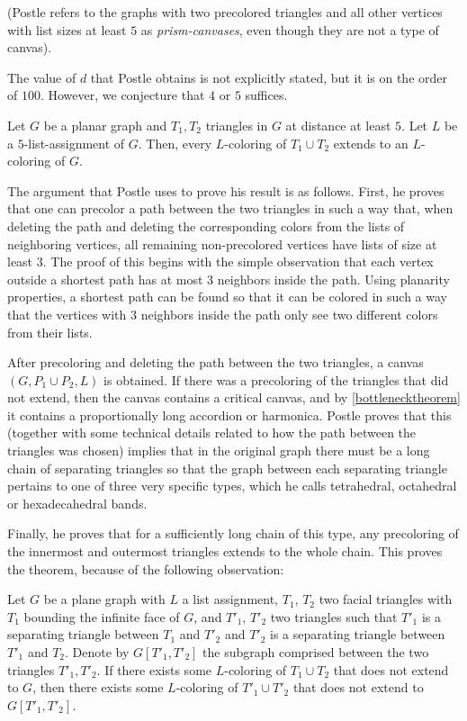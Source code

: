(Postle refers to the graphs with two precolored triangles and all other vertices with list sizes
at least $5$ as \emph{prism-canvases}, even though they are not a type of canvas).

The value of $d$ that Postle obtains is not explicitly stated, but it is on the order of $100$. However, we conjecture that $4$ or $5$ suffices.

\begin{conjecture}
\label{twotriangleconjecture}
Let $G$ be a planar graph and $T_1, T_2$ triangles in $G$ at distance at least $5$. Let $L$ be a $5$-list-assignment of $G$. Then, every $L$-coloring of $T_1 \cup T_2$ extends to an $L$-coloring of $G$.
\end{conjecture}

The argument that Postle uses to prove his result is as follows. First, he proves that one can precolor a path between the two triangles in such a way that, when deleting the path and deleting the corresponding colors from the lists of neighboring vertices, all remaining non-precolored vertices have lists of size at least $3$. The proof of this begins with the simple observation that each vertex outside a shortest path has at most $3$ neighbors inside the path. Using planarity properties, a shortest path can be found so that it can be colored in such a way that the vertices with $3$ neighbors inside the path only see two different colors from their lists.

After precoloring and deleting the path between the two triangles, a canvas $(G, P_1 \cup P_2, L)$ is obtained. If there was a precoloring of the triangles that did not extend, then the canvas contains a critical canvas, and by \ref{bottlenecktheorem} it contains a proportionally long accordion or harmonica. Postle proves that this (together with some technical details related to how the path between the triangles was chosen) implies that in the original graph there must be a long chain of separating triangles so that the graph between each separating triangle pertains to one of three very specific types, which he calls tetrahedral, octahedral or hexadecahedral bands. 


Finally, he proves that for a sufficiently long chain of this type, any precoloring of the innermost and outermost triangles extends to the whole chain. This proves the theorem, because of the following observation:

\begin{proposition}
	Let $G$ be a plane graph with $L$ a list assignment, $T_1$, $T_2$ 
	two facial triangles with $T_1$ bounding the infinite face of $G$, 
	and $T'_1$, $T'_2$ two triangles such that $T'_1$ is a separating 
	triangle between $T_1$ and $T'_2$ and $T'_2$ is a separating 
	triangle between $T'_1$ and $T_2$. Denote by $G[T'_1, T'_2]$ the 
	subgraph comprised between the two triangles $T'_1, T'_2$.  
	If there exists some $L$-coloring of $T_1 \cup T_2$ that does not 
	extend to $G$, then there exists some $L$-coloring of $T'_1 \cup T'_2$ 
	that does not extend to $G[T'_1, T'_2]$.
\end{proposition}

